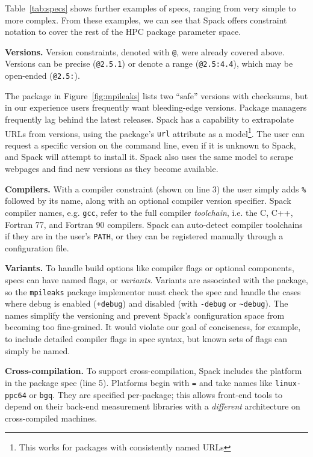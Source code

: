 Table~\ref{tab:specs} shows further examples of specs, ranging from very
simple to more complex. From these examples, we can see that Spack offers constraint
notation to cover the rest of the HPC package parameter space.

{\bf Versions.}
Version constraints, denoted with {\tt @}, were already covered above. Versions
can be precise ({\tt @2.5.1}) or denote a range ({\tt @2.5:4.4}),
which may be open-ended ({\tt @2.5:}).

The package in Figure~\ref{fig:mpileaks} lists two ``safe'' versions with checksums, but
in our experience users frequently want bleeding-edge versions.  Package managers
frequently lag behind the latest releases.
Spack has a capability to extrapolate URLs from versions,
using the package's {\tt url} attribute as a model\footnote{This works
for packages with consistently named URLs}.  The user can request a specific
version on the command line, even if it is unknown to Spack,
and Spack will attempt to install it.  Spack also uses the same
model to scrape webpages and find new versions as they become available.

{\bf Compilers.}
With a compiler constraint (shown on line 3) the user
simply adds {\tt \%} followed by its name, along with an optional compiler version
specifier.  Spack compiler names, e.g. {\tt gcc}, refer to the full compiler {\it toolchain},
i.e. the C, C++, Fortran 77, and Fortran 90 compilers.  Spack can auto-detect
compiler toolchains if they are in the user's {\tt PATH}, or they can be registered manually
through a configuration file.

{\bf Variants.}
To handle build options like compiler flags or optional components, specs can
have named flags, or {\it variants}.  Variants are associated with the package,
so the {\tt mpileaks} package implementor must check the spec and handle the cases
where debug is enabled ({\tt +debug}) and disabled (with {\tt -debug}
or {\tt \textasciitilde \ignorespaces debug}).  The names simplify the versioning and prevent
Spack's configuration space from becoming too fine-grained.
It would violate our goal of conciseness, for example, to include detailed
compiler flags in spec syntax, but known sets of flags can simply be named.

{\bf Cross-compilation.}
To support cross-compilation, Spack includes the platform in the package spec (line 5).
Platforms begin with {\tt =} and take names like {\tt linux-ppc64} or {\tt bgq}.  They are
specified per-package; this allows front-end tools to depend on their back-end measurement
libraries with a {\it different} architecture on cross-compiled machines.

